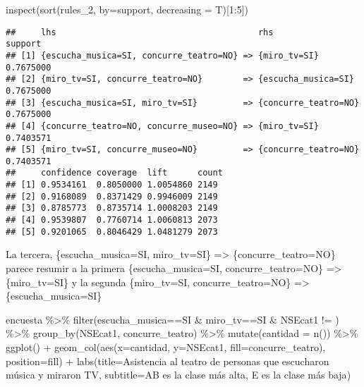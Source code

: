\documentclass[
]{article}
\newenvironment{Shaded}{\begin{snugshade}}{\end{snugshade}}
\newcommand{\AttributeTok}[1]{\textcolor[rgb]{0.77,0.63,0.00}{#1}}
\newcommand{\DecValTok}[1]{\textcolor[rgb]{0.00,0.00,0.81}{#1}}
\newcommand{\FunctionTok}[1]{\textcolor[rgb]{0.00,0.00,0.00}{#1}}
\newcommand{\NormalTok}[1]{#1}
\newcommand{\SpecialCharTok}[1]{\textcolor[rgb]{0.00,0.00,0.00}{#1}}
\newcommand{\StringTok}[1]{\textcolor[rgb]{0.31,0.60,0.02}{#1}}
\begin{document}
\begin{Shaded}
\begin{Highlighting}[]
\FunctionTok{inspect}\NormalTok{(}\FunctionTok{sort}\NormalTok{(rules\_2, }\AttributeTok{by=}\StringTok{\textquotesingle{}support\textquotesingle{}}\NormalTok{, }\AttributeTok{decreasing =}\NormalTok{ T)[}\DecValTok{1}\SpecialCharTok{:}\DecValTok{5}\NormalTok{])}
\end{Highlighting}
\end{Shaded}

\begin{verbatim}
##     lhs                                        rhs                  support  
## [1] {escucha_musica=SI, concurre_teatro=NO} => {miro_tv=SI}         0.7675000
## [2] {miro_tv=SI, concurre_teatro=NO}        => {escucha_musica=SI}  0.7675000
## [3] {escucha_musica=SI, miro_tv=SI}         => {concurre_teatro=NO} 0.7675000
## [4] {concurre_teatro=NO, concurre_museo=NO} => {miro_tv=SI}         0.7403571
## [5] {miro_tv=SI, concurre_museo=NO}         => {concurre_teatro=NO} 0.7403571
##     confidence coverage  lift      count
## [1] 0.9534161  0.8050000 1.0054860 2149 
## [2] 0.9168089  0.8371429 0.9946009 2149 
## [3] 0.8785773  0.8735714 1.0008203 2149 
## [4] 0.9539807  0.7760714 1.0060813 2073 
## [5] 0.9201065  0.8046429 1.0481279 2073
\end{verbatim}

La tercera, \{escucha\_musica=SI, miro\_tv=SI\} =\textgreater{}
\{concurre\_teatro=NO\} parece resumir a la primera
\{escucha\_musica=SI, concurre\_teatro=NO\} =\textgreater{}
\{miro\_tv=SI\} y la segunda \{miro\_tv=SI, concurre\_teatro=NO\}
=\textgreater{} \{escucha\_musica=SI\}

\begin{Shaded}
\begin{Highlighting}[]
\NormalTok{encuesta }\SpecialCharTok{\%\textgreater{}\%} 
  \FunctionTok{filter}\NormalTok{(escucha\_musica}\SpecialCharTok{==}\StringTok{\textquotesingle{}SI\textquotesingle{}} \SpecialCharTok{\&}\NormalTok{ miro\_tv}\SpecialCharTok{==}\StringTok{\textquotesingle{}SI\textquotesingle{}} \SpecialCharTok{\&}\NormalTok{ NSEcat1 }\SpecialCharTok{!=} \StringTok{\textquotesingle{}\textquotesingle{}}\NormalTok{) }\SpecialCharTok{\%\textgreater{}\%} 
  \FunctionTok{group\_by}\NormalTok{(NSEcat1, concurre\_teatro) }\SpecialCharTok{\%\textgreater{}\%} 
  \FunctionTok{mutate}\NormalTok{(}\AttributeTok{cantidad =} \FunctionTok{n}\NormalTok{()) }\SpecialCharTok{\%\textgreater{}\%} 
  \FunctionTok{ggplot}\NormalTok{() }\SpecialCharTok{+}
  \FunctionTok{geom\_col}\NormalTok{(}\FunctionTok{aes}\NormalTok{(}\AttributeTok{x=}\NormalTok{cantidad, }\AttributeTok{y=}\NormalTok{NSEcat1, }\AttributeTok{fill=}\NormalTok{concurre\_teatro), }\AttributeTok{position=}\StringTok{\textquotesingle{}fill\textquotesingle{}}\NormalTok{) }\SpecialCharTok{+}
  \FunctionTok{labs}\NormalTok{(}\AttributeTok{title=}\StringTok{\textquotesingle{}Asistencia al teatro de personas que escucharon música y miraron TV\textquotesingle{}}\NormalTok{, }\AttributeTok{subtitle=}\StringTok{\textquotesingle{}AB es la clase más alta, E es la clase más baja\textquotesingle{}}\NormalTok{)}
\end{Highlighting}
\end{Shaded}
\end{document}
